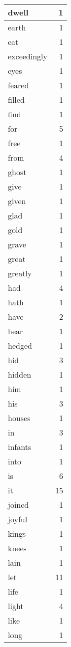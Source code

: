 \begin{center}
\begin{longtable}{l|r}
dwell & 1\\ \hline 
earth & 1\\ \hline 
eat & 1\\ \hline 
exceedingly & 1\\ \hline 
eyes & 1\\ \hline 
feared & 1\\ \hline 
filled & 1\\ \hline 
find & 1\\ \hline 
for & 5\\ \hline 
free & 1\\ \hline 
from & 4\\ \hline 
ghost & 1\\ \hline 
give & 1\\ \hline 
given & 1\\ \hline 
glad & 1\\ \hline 
gold & 1\\ \hline 
grave & 1\\ \hline 
great & 1\\ \hline 
greatly & 1\\ \hline 
had & 4\\ \hline 
hath & 1\\ \hline 
have & 2\\ \hline 
hear & 1\\ \hline 
hedged & 1\\ \hline 
hid & 3\\ \hline 
hidden & 1\\ \hline 
him & 1\\ \hline 
his & 3\\ \hline 
houses & 1\\ \hline 
in & 3\\ \hline 
infants & 1\\ \hline 
into & 1\\ \hline 
is & 6\\ \hline 
it & 15\\ \hline 
joined & 1\\ \hline 
joyful & 1\\ \hline 
kings & 1\\ \hline 
knees & 1\\ \hline 
lain & 1\\ \hline 
let & 11\\ \hline 
life & 1\\ \hline 
light & 4\\ \hline 
like & 1\\ \hline 
long & 1\\ \hline 

\end{longtable}
\end{center}
